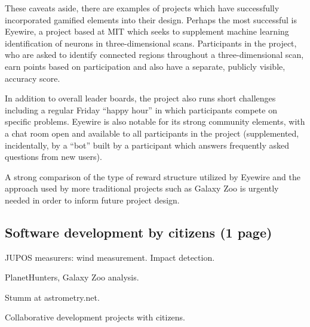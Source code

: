 \documentclass{ar2e}
\begin{document}
These caveats aside, there are examples of projects which have successfully
incorporated gamified elements into their design. Perhaps the most successful
is Eyewire, a project based at MIT which seeks to supplement machine learning
identification of neurons in three-dimensional scans. Participants in the
project, who are asked to identify connected regions throughout a
three-dimensional scan, earn points based on participation and also have a
separate, publicly visible, accuracy score. 


In addition to overall leader
boards, the project also runs short challenges including a regular Friday
``happy hour'' in which participants compete on specific problems. Eyewire is
also notable for its strong community elements, with a chat room open and
available to all participants in the project (supplemented, incidentally, by a
``bot'' built by a participant which answers frequently asked questions from new
users). 


A strong comparison of the type of reward structure utilized by
Eyewire and the approach used by more traditional projects such as Galaxy Zoo
is urgently needed in order to inform future project design. 



\subsection{Software development by citizens (1 page)}
\label{sec:instr:software}

JUPOS measurers: wind measurement. 
Impact detection.

PlanetHunters, Galaxy Zoo analysis.

Stumm at astrometry.net.  

Collaborative development projects with citizens. 

\end{document}
